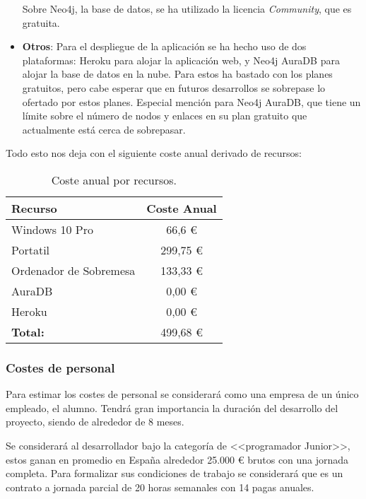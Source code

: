 \begin{itemize}
Sobre Neo4j, la base de datos, se ha utilizado la licencia \textit{Community}, que es gratuita. 


\item \textbf{Otros}:
Para el despliegue de la aplicación se ha hecho uso de dos plataformas: Heroku para alojar la aplicación web, y Neo4j AuraDB para alojar la base de datos en la nube. Para estos ha bastado con los planes gratuitos, pero cabe esperar que en futuros desarrollos se sobrepase lo ofertado por estos planes. Especial mención para Neo4j AuraDB, que tiene un límite sobre el número de nodos y enlaces en su plan gratuito que actualmente está cerca de sobrepasar.


	
	
\end{itemize}

Todo esto nos deja con el siguiente coste anual derivado de recursos:

\begin{table}[h!]
	\centering
	\begin{tabular}{| l | c |}
		\toprule
		\textbf{Recurso} & \textbf{Coste Anual} \\ \midrule
		Windows 10 Pro & 66,6 €\\
		Portatil & 299,75 € \\
		Ordenador de Sobremesa & 133,33 €\\
		AuraDB & 0,00 €\\
		Heroku & 0,00 €\\
		\midrule
		\textbf{Total:} & 499,68 € \\
		\bottomrule
	\end{tabular}
	\caption{Coste anual por recursos.}
	\label{CostResources}
\end{table}

\subsubsection{Costes de personal}
Para estimar los costes de personal se considerará como una empresa de un único empleado, el alumno. Tendrá gran importancia la duración del desarrollo del proyecto, siendo de alrededor de 8 meses.

Se considerará al desarrollador bajo la categoría de <<programador Junior>>, estos ganan en promedio en España alrededor 25.000 € brutos con una jornada completa. Para formalizar sus condiciones de trabajo se considerará que es un contrato a jornada parcial de 20 horas semanales con 14 pagas anuales.

